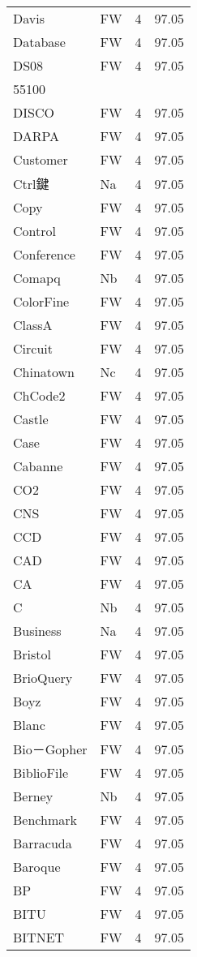 \documentclass[twocolumn]{book}
\begin{document}
\begin{supertabular}{llrr}
Davis & FW & 4 &  97.05\\
Database & FW & 4 &  97.05\\
DS08 & FW & 4 &  97.05\\
55100\\
DISCO & FW & 4 &  97.05\\
DARPA & FW & 4 &  97.05\\
Customer & FW & 4 &  97.05\\
Ctrl鍵 & Na & 4 &  97.05\\
Copy & FW & 4 &  97.05\\
Control & FW & 4 &  97.05\\
Conference & FW & 4 &  97.05\\
Comapq & Nb & 4 &  97.05\\
ColorFine & FW & 4 &  97.05\\
ClassA & FW & 4 &  97.05\\
Circuit & FW & 4 &  97.05\\
Chinatown & Nc & 4 &  97.05\\
ChCode2 & FW & 4 &  97.05\\
Castle & FW & 4 &  97.05\\
Case & FW & 4 &  97.05\\
Cabanne & FW & 4 &  97.05\\
CO2 & FW & 4 &  97.05\\
CNS & FW & 4 &  97.05\\
CCD & FW & 4 &  97.05\\
CAD & FW & 4 &  97.05\\
CA & FW & 4 &  97.05\\
C & Nb & 4 &  97.05\\
Business & Na & 4 &  97.05\\
Bristol & FW & 4 &  97.05\\
BrioQuery & FW & 4 &  97.05\\
Boyz & FW & 4 &  97.05\\
Blanc & FW & 4 &  97.05\\
Bio－Gopher & FW & 4 &  97.05\\
BiblioFile & FW & 4 &  97.05\\
Berney & Nb & 4 &  97.05\\
Benchmark & FW & 4 &  97.05\\
Barracuda & FW & 4 &  97.05\\
Baroque & FW & 4 &  97.05\\
BP & FW & 4 &  97.05\\
BITU & FW & 4 &  97.05\\
BITNET & FW & 4 &  97.05\\

\end{supertabular}
\end{document}
